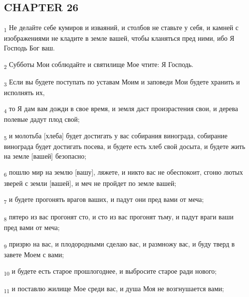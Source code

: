 \subsection{CHAPTER 26}
\begin{tcolorbox}
\textsubscript{1} Не делайте себе кумиров и изваяний, и столбов не ставьте у себя, и камней с изображениями не кладите в земле вашей, чтобы кланяться пред ними, ибо Я Господь Бог ваш.
\end{tcolorbox}
\begin{tcolorbox}
\textsubscript{2} Субботы Мои соблюдайте и святилище Мое чтите: Я Господь.
\end{tcolorbox}
\begin{tcolorbox}
\textsubscript{3} Если вы будете поступать по уставам Моим и заповеди Мои будете хранить и исполнять их,
\end{tcolorbox}
\begin{tcolorbox}
\textsubscript{4} то Я дам вам дожди в свое время, и земля даст произрастения свои, и дерева полевые дадут плод свой;
\end{tcolorbox}
\begin{tcolorbox}
\textsubscript{5} и молотьба [хлеба] будет достигать у вас собирания винограда, собирание винограда будет достигать посева, и будете есть хлеб свой досыта, и будете жить на земле [вашей] безопасно;
\end{tcolorbox}
\begin{tcolorbox}
\textsubscript{6} пошлю мир на землю [вашу], ляжете, и никто вас не обеспокоит, сгоню лютых зверей с земли [вашей], и меч не пройдет по земле вашей;
\end{tcolorbox}
\begin{tcolorbox}
\textsubscript{7} и будете прогонять врагов ваших, и падут они пред вами от меча;
\end{tcolorbox}
\begin{tcolorbox}
\textsubscript{8} пятеро из вас прогонят сто, и сто из вас прогонят тьму, и падут враги ваши пред вами от меча;
\end{tcolorbox}
\begin{tcolorbox}
\textsubscript{9} призрю на вас, и плодородными сделаю вас, и размножу вас, и буду тверд в завете Моем с вами;
\end{tcolorbox}
\begin{tcolorbox}
\textsubscript{10} и будете есть старое прошлогоднее, и выбросите старое ради нового;
\end{tcolorbox}
\begin{tcolorbox}
\textsubscript{11} и поставлю жилище Мое среди вас, и душа Моя не возгнушается вами;
\end{tcolorbox}
